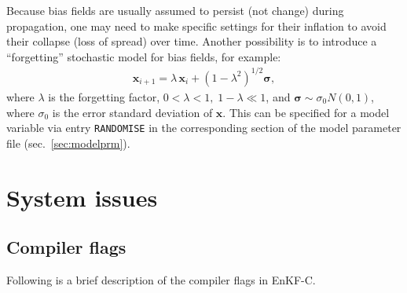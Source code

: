 \documentclass[11pt]{report}
\newcommand{\mb} {\mathbf}
\newcommand{\ms} {\boldsymbol}
\begin{document}
Because bias fields are usually assumed to persist (not change) during propagation, one may need to make specific settings for their inflation to avoid their collapse (loss of spread) over time.
Another possibility is to introduce a ``forgetting'' stochastic model for bias fields, for example:
\begin{align*}
  \mb x_{i+1} = \lambda \, \mb x_i + (1 - \lambda^2)^{1/2} \ms \sigma,
\end{align*}
where $\lambda$ is the forgetting factor, $0 < \lambda < 1, \; 1 - \lambda \ll 1$, and $\ms \sigma \sim \sigma_0 N(0, 1)$, where $\sigma_0$ is the error standard deviation of $\mb x$.
This can be specified for a model variable via entry \verb|RANDOMISE| in the corresponding section of the model parameter file (sec.~\ref{sec:modelprm}).

\section{System issues}

\subsection{Compiler flags}

Following is a brief description of the compiler flags in EnKF-C.
\end{document}
